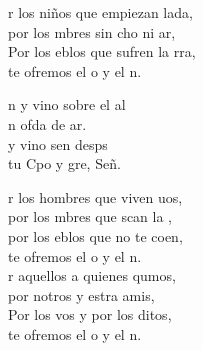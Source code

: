 \begin{cancion}%
	r los niños que empiezan lada,\\
	por los mbres sin cho ni ar,\\
	Por los eblos que sufren la rra,\\
	te ofremos el o y el n.  \jump\\
	\begin{chorus}%
		n y vino sobre el al \\
		n ofda de ar.\\
		 y vino sen desps\\
		tu Cpo y gre, Señ.\jump\\
	\end{chorus}%
	r los hombres que viven uos,\\
	por los mbres que scan la ,\\
	por los eblos que no te coen,\\
	te ofremos el o y el n.  \\
	\jump
	r aquellos a quienes qumos,\\
	por notros y estra amis,\\
	Por los vos y por los ditos,\\
	te ofremos el o y el n.  \\
\end{cancion}%
